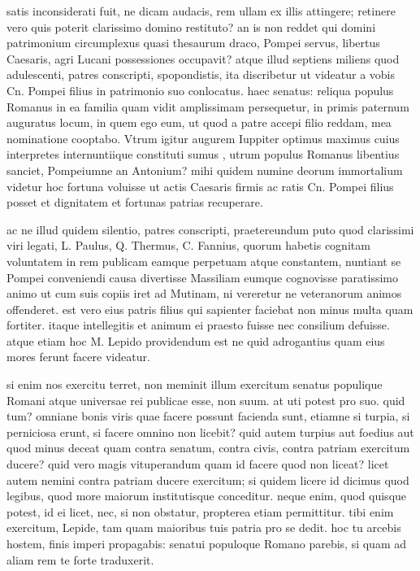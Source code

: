  satis inconsiderati fuit, ne dicam audacis, rem ullam ex illis attingere; retinere vero quis poterit clarissimo domino restituto? an is non reddet qui domini patrimonium circumplexus quasi thesaurum draco, Pompei servus, libertus Caesaris, agri Lucani possessiones occupavit? atque illud septiens miliens quod adulescenti, patres conscripti, spopondistis, ita discribetur ut videatur a vobis Cn. Pompei filius in patrimonio suo conlocatus. haec senatus: reliqua populus Romanus in ea familia quam vidit amplissimam persequetur, in primis paternum auguratus locum, in quem ego eum, ut quod a patre accepi filio reddam, mea nominatione cooptabo. Vtrum igitur augurem Iuppiter optimus maximus cuius interpretes internuntiique constituti sumus , utrum populus Romanus libentius sanciet, Pompeiumne an Antonium? mihi quidem numine deorum immortalium videtur hoc fortuna voluisse ut actis Caesaris firmis ac ratis Cn. Pompei filius posset et dignitatem et fortunas patrias recuperare.

 ac ne illud quidem silentio, patres conscripti, praetereundum puto quod clarissimi viri legati, L. Paulus, Q. Thermus, C. Fannius, quorum habetis cognitam voluntatem in rem publicam eamque perpetuam atque constantem, nuntiant se Pompei conveniendi causa divertisse Massiliam eumque cognovisse paratissimo animo ut cum suis copiis iret ad Mutinam, ni vereretur ne veteranorum animos offenderet. est vero eius patris filius qui sapienter faciebat non minus multa quam fortiter. itaque intellegitis et animum ei praesto fuisse nec consilium defuisse. atque etiam hoc M. Lepido providendum est ne quid adrogantius quam eius mores ferunt facere videatur.

 si enim nos exercitu terret, non meminit illum exercitum senatus populique Romani atque universae rei publicae esse, non suum. at uti potest pro suo. quid tum? omniane bonis viris quae facere possunt facienda sunt, etiamne si turpia, si perniciosa erunt, si facere omnino non licebit? quid autem turpius aut foedius aut quod minus deceat quam contra senatum, contra civis, contra patriam exercitum ducere? quid vero magis vituperandum quam id facere quod non liceat? licet autem nemini contra patriam ducere exercitum; si quidem licere id dicimus quod legibus, quod more maiorum institutisque conceditur. neque enim, quod quisque potest, id ei licet, nec, si non obstatur, propterea etiam permittitur. tibi enim exercitum, Lepide, tam quam maioribus tuis patria pro se dedit. hoc tu arcebis hostem, finis imperi propagabis: senatui populoque Romano parebis, si quam ad aliam rem te forte traduxerit.

